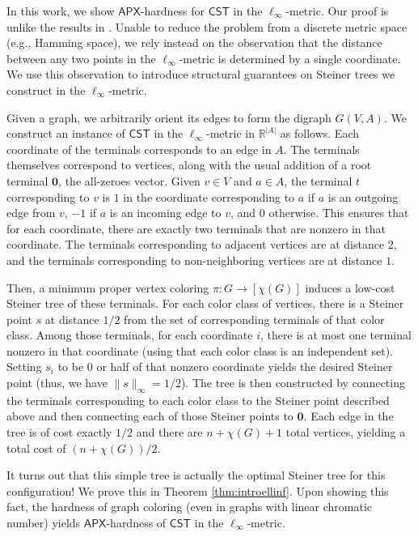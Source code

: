 \documentclass{article}\providecommand{\DeclareRedundantLanguages}[2]{}\usepackage[a4paper,margin=20mm]{geometry}
\newcommand{\R}{\mathbb{R}}
\newcommand{\1}{\textbf{1}}
\newcommand{\cst}{$\mathsf{CST}$\xspace}
\newcommand{\apx}{$\mathsf{APX}$\xspace}
\begin{document}
In this work, we show \apx-hardness for \cst in the $\ell_{\infty}$-metric. Our proof is unlike the results in \cite{Wareham_1995, Trevisan00}. Unable to reduce the problem from a discrete metric space (e.g., Hamming space), we rely instead on the observation that the distance between any two points in the $\ell_{\infty}$-metric is determined by a single coordinate. We use this observation to introduce structural guarantees on Steiner trees we construct in the $\ell_{\infty}$-metric.

Given a graph, we arbitrarily orient its edges to form the digraph $G(V, A)$. We construct an instance of \cst in the $\ell_{\infty}$-metric in $\R^{|A|}$ as follows. Each coordinate of the terminals corresponds to an edge in $A$. The terminals themselves correspond to vertices, along with the usual addition of a root terminal $\mathbf{0}$, the all-zeroes vector. Given $v \in V$ and $a \in A$, the terminal $t$ corresponding to $v$ is $1$ in the coordinate corresponding to $a$ if $a$ is an outgoing edge from $v$, $-1$ if $a$ is an incoming edge to $v$, and $0$ otherwise. This ensures that for each coordinate, there are exactly two terminals that are nonzero in that coordinate. The terminals corresponding to adjacent vertices are at distance $2$, and the terminals corresponding to non-neighboring vertices are at distance $1$.

Then, a minimum proper vertex coloring $\pi: G \to [\chi(G)]$ induces a low-cost Steiner tree of these terminals. For each color class of vertices, there is a Steiner point $s$ at distance $1/2$ from the set of corresponding terminals of that color class. Among those terminals, for each coordinate $i$, there is at most one terminal nonzero in that coordinate (using that each color class is an independent set). Setting $s_i$ to be $0$ or half of that nonzero coordinate yields the desired Steiner point (thus, we have $\|s\|_\infty=1/2$). The tree  is then constructed by connecting the terminals corresponding to each color class to the  Steiner point described above and then connecting each of those Steiner points to $\mathbf{0}$. Each edge in the tree is of cost exactly $1/2$ and there are $n + \chi(G) + 1$ total vertices, yielding a total cost of $(n + \chi(G))/2$. 

It turns out that this simple tree is actually the optimal Steiner tree for this configuration! We prove this in Theorem \ref{thm:introellinf}. Upon showing this fact, the hardness of graph coloring (even in graphs with linear chromatic number) yields \apx-hardness of \cst in the $\ell_{\infty}$-metric. 
\end{document}
